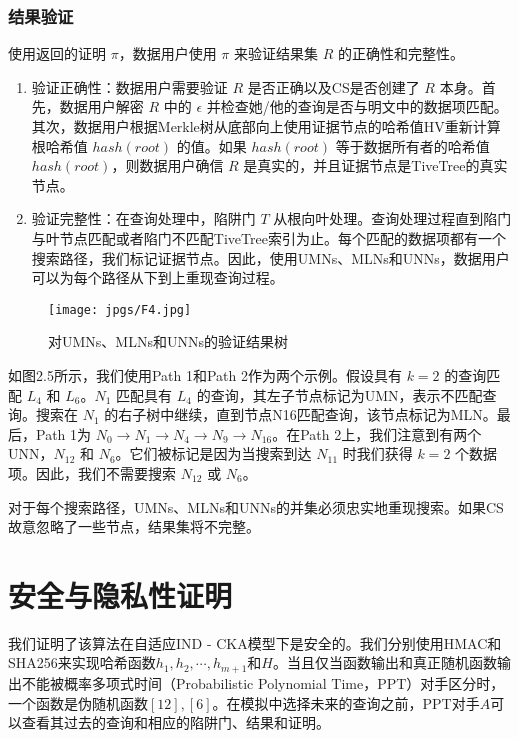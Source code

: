 \documentclass{cumcmthesis}
\numberwithin{equation}{section} %
\numberwithin{figure}{section} %
\numberwithin{table}{section} %
\begin{document}
\subsubsection{结果验证}
使用返回的证明 $\pi$，数据用户使用 $\pi$ 来验证结果集 $R$ 的正确性和完整性。
\begin{enumerate}[label=\textbullet]
    \item 验证正确性：数据用户需要验证 $R$ 是否正确以及CS是否创建了 $R$ 本身。首先，数据用户解密 $R$ 中的 $\epsilon$ 并检查她/他的查询是否与明文中的数据项匹配。其次，数据用户根据Merkle树从底部向上使用证据节点的哈希值HV重新计算根哈希值 $hash(root)$ 的值。如果 $hash(root)$ 等于数据所有者的哈希值 $hash(root)$，则数据用户确信 $R$ 是真实的，并且证据节点是TiveTree的真实节点。
    \item 验证完整性：在查询处理中，陷阱门 $T$ 从根向叶处理。查询处理过程直到陷门与叶节点匹配或者陷门不匹配TiveTree索引为止。每个匹配的数据项都有一个搜索路径，我们标记证据节点。因此，使用UMNs、MLNs和UNNs，数据用户可以为每个路径从下到上重现查询过程。
\end{enumerate}

\begin{figure}[H]
    \centering
    \texttt{[image: jpgs/F4.jpg]}
    \caption{对UMNs、MLNs和UNNs的验证结果树}
    \label{fig:verification_result_tree}
\end{figure}

如图2.5所示，我们使用Path 1和Path 2作为两个示例。假设具有 \(k = 2\) 的查询匹配 \(L_4\) 和 \(L_6\)。\(N_1\) 匹配具有 \(L_4\) 的查询，其左子节点标记为UMN，表示不匹配查询。搜索在 \(N_1\) 的右子树中继续，直到节点N16匹配查询，该节点标记为MLN。最后，Path 1为 \(N_0 \to N_1 \to N_4 \to N_9 \to N_{16}\)。在Path 2上，我们注意到有两个UNN，\(N_{12}\) 和 \(N_6\)。它们被标记是因为当搜索到达 \(N_{11}\) 时我们获得 \(k = 2\) 个数据项。因此，我们不需要搜索 \(N_{12}\) 或 \(N_6\)。

对于每个搜索路径，UMNs、MLNs和UNNs的并集必须忠实地重现搜索。如果CS故意忽略了一些节点，结果集将不完整。

\newpage

\section{安全与隐私性证明}

我们证明了该算法在自适应IND - CKA模型下是安全的。我们分别使用HMAC和SHA256来实现哈希函数\(h_{1}, h_{2}, \cdots, h_{m + 1}\)和\(H\)。当且仅当函数输出和真正随机函数输出不能被概率多项式时间（Probabilistic Polynomial Time，PPT）对手区分时，一个函数是伪随机函数\([12],[6]\)。在模拟中选择未来的查询之前，PPT对手\(A\)可以查看其过去的查询和相应的陷阱门、结果和证明。
\end{document}
